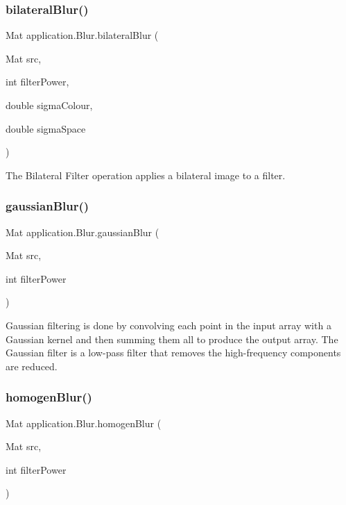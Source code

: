 \subsubsection{\texorpdfstring{bilateral\+Blur()}{bilateralBlur()}}
{\footnotesize\ttfamily Mat application.\+Blur.\+bilateral\+Blur (\begin{DoxyParamCaption}\item[{Mat}]{src,  }\item[{int}]{filter\+Power,  }\item[{double}]{sigma\+Colour,  }\item[{double}]{sigma\+Space }\end{DoxyParamCaption})}

The Bilateral Filter operation applies a bilateral image to a filter. \mbox{\label{classapplication_1_1_blur_a445cba49c071e6a84b9ae6d56f208f60}} 
\subsubsection{\texorpdfstring{gaussian\+Blur()}{gaussianBlur()}}
{\footnotesize\ttfamily Mat application.\+Blur.\+gaussian\+Blur (\begin{DoxyParamCaption}\item[{Mat}]{src,  }\item[{int}]{filter\+Power }\end{DoxyParamCaption})}

Gaussian filtering is done by convolving each point in the input array with a Gaussian kernel and then summing them all to produce the output array. The Gaussian filter is a low-\/pass filter that removes the high-\/frequency components are reduced. \mbox{\label{classapplication_1_1_blur_aa26cb7151a1acda73884d3fb9479e971}} 
\subsubsection{\texorpdfstring{homogen\+Blur()}{homogenBlur()}}
{\footnotesize\ttfamily Mat application.\+Blur.\+homogen\+Blur (\begin{DoxyParamCaption}\item[{Mat}]{src,  }\item[{int}]{filter\+Power }\end{DoxyParamCaption})}

